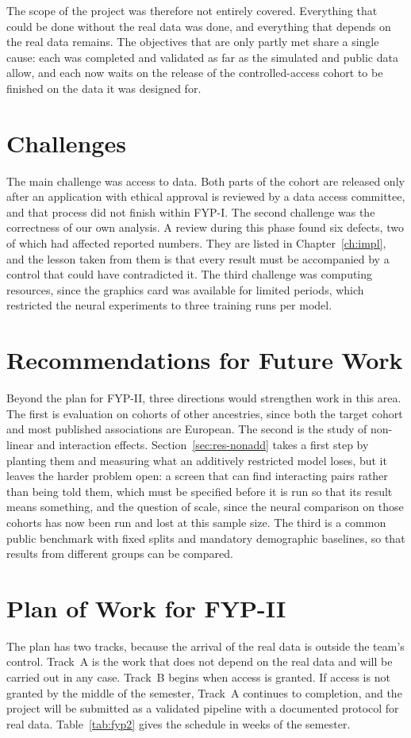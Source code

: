 The scope of the project was therefore not entirely covered. Everything that could be done without the real data was done, and everything that depends on the real data remains. The objectives that are only partly met share a single cause: each was completed and validated as far as the simulated and public data allow, and each now waits on the release of the controlled-access cohort to be finished on the data it was designed for.

\section{Challenges}
The main challenge was access to data. Both parts of the cohort are released only after an application with ethical approval is reviewed by a data access committee, and that process did not finish within FYP-I. The second challenge was the correctness of our own analysis. A review during this phase found six defects, two of which had affected reported numbers. They are listed in Chapter~\ref{ch:impl}, and the lesson taken from them is that every result must be accompanied by a control that could have contradicted it. The third challenge was computing resources, since the graphics card was available for limited periods, which restricted the neural experiments to three training runs per model.

\section{Recommendations for Future Work}
Beyond the plan for FYP-II, three directions would strengthen work in this area. The first is evaluation on cohorts of other ancestries, since both the target cohort and most published associations are European. The second is the study of non-linear and interaction effects. Section~\ref{sec:res-nonadd} takes a first step by planting them and measuring what an additively restricted model loses, but it leaves the harder problem open: a screen that can find interacting pairs rather than being told them, which must be specified before it is run so that its result means something, and the question of scale, since the neural comparison on those cohorts has now been run and lost at this sample size. The third is a common public benchmark with fixed splits and mandatory demographic baselines, so that results from different groups can be compared.

\section{Plan of Work for FYP-II}
The plan has two tracks, because the arrival of the real data is outside the team's control. Track~A is the work that does not depend on the real data and will be carried out in any case. Track~B begins when access is granted. If access is not granted by the middle of the semester, Track~A continues to completion, and the project will be submitted as a validated pipeline with a documented protocol for real data. Table~\ref{tab:fyp2} gives the schedule in weeks of the semester.

